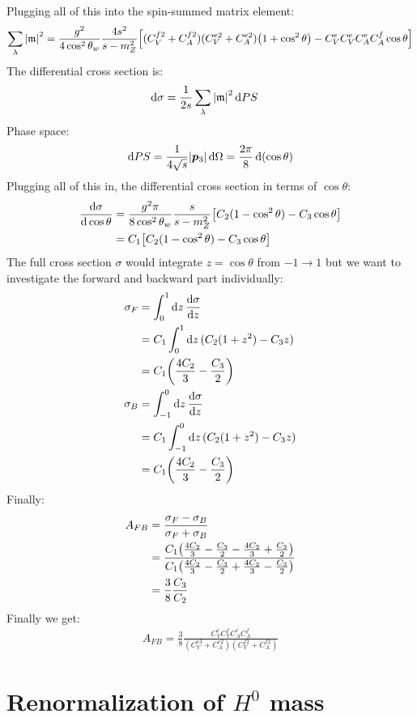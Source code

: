 \documentclass[12pt]{article}
\begin{document}
Plugging all of this into the spin-summed matrix element:
\begin{align*}
  \sum_\lambda\abs{\mathfrak{m}}^2=\frac{g^2}{4\cos^2\theta_w}
  \frac{4s^2}{s-m_Z^2}\qty[(C_V^{f2}+C_A^{f2})(C_V^{e2}+C_A^{e2})
  \qty(1+\cos^2\theta)-C_V^eC_V^eC_A^eC_A^f\cos\theta]
\end{align*}
The differential cross section is:
\begin{align*}
  \dd{\sigma}&=\frac{1}{2s}\sum_\lambda\abs{\mathfrak{m}}^2\dd{PS}
\end{align*}
Phase space:
\begin{align*}
  \dd{PS}=\frac{1}{4\sqrt{s}}\abs{\bm{p}_3}\dd{\Omega}
  =\frac{2\pi}{8}\dd{(\cos\theta)}
\end{align*}
Plugging all of this in, the differential cross section in terms of $\cos\theta$:
\begin{align*}
  \dv{\sigma}{\cos\theta}&=\frac{g^2\pi}{8\cos^2\theta_w}\frac{s}{s-m_Z^2}
  \qty[C_2(1-\cos^2\theta)-C_3\cos\theta]\\
  &=C_1 \qty[C_2(1-\cos^2\theta)-C_3\cos\theta]
\end{align*}
The full cross section $\sigma$ would integrate $z=\cos\theta$ from $-1\to1$ but we want to investigate the forward and backward part individually:
\begin{align*}
  \sigma_F&=\int_0^1\dd{z}\dv{\sigma}{z}\\
  &=C_1\int_0^1\dd{z}(C_2(1+z^2)-C_3z)\\
  &=C_1\qty(\frac{4C_2}{3}-\frac{C_3}{2})\\
  \sigma_B&=\int_{-1}^0\dd{z}\dv{\sigma}{z}\\
  &=C_1\int_{-1}^0\dd{z}(C_2(1+z^2)-C_3z)\\
  &=C_1\qty(\frac{4C_2}{3}-\frac{C_3}{2})
\end{align*}
Finally:
\begin{align*}
  A_{FB}&=\frac{\sigma_F-\sigma_B}{\sigma_F+\sigma_B}\\
  &=\frac{C_1\qty(\frac{4C_2}{3}-\frac{C_3}{2}-\frac{4C_2}{3}+\frac{C_3}{2})}
  {C_1\qty(\frac{4C_2}{3}-\frac{C_3}{2}+\frac{4C_2}{3}-\frac{C_3}{2})}\\
  &=\frac{3}{8}\frac{C_3}{C_2}
\end{align*}
Finally we get:
\begin{align*}
  \boxed{A_{FB}=
    \frac{3}{8}\frac{C_V^eC_V^fC_A^eC_A^f}
    {(C_V^{e3}+C_A^{e2})(C_V^{f2}+C_A^{f2})}}
\end{align*}
\newpage\section{Renormalization of $H^0$ mass}
\end{document}
